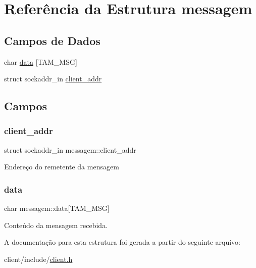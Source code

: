 \hypertarget{structmessagem}{}\section{Referência da Estrutura messagem}
\label{structmessagem}
\subsection*{Campos de Dados}
\begin{DoxyCompactItemize}
\item 
char \hyperlink{structmessagem_a23e2fc404fdd389c4ff6da925ab4ae21}{data} \mbox{[}T\+A\+M\+\_\+\+M\+SG\mbox{]}
\item 
struct sockaddr\+\_\+in \hyperlink{structmessagem_af4f1e53a419d163b87b5c4d510fb5a0f}{client\+\_\+addr}
\end{DoxyCompactItemize}


\subsection{Campos}
\mbox{\label{structmessagem_af4f1e53a419d163b87b5c4d510fb5a0f}} 
\subsubsection{\texorpdfstring{client\+\_\+addr}{client\_addr}}
{\footnotesize\ttfamily struct sockaddr\+\_\+in messagem\+::client\+\_\+addr}

Endereço do remetente da mensagem \mbox{\label{structmessagem_a23e2fc404fdd389c4ff6da925ab4ae21}} 
\subsubsection{\texorpdfstring{data}{data}}
{\footnotesize\ttfamily char messagem\+::data\mbox{[}T\+A\+M\+\_\+\+M\+SG\mbox{]}}

Conteúdo da mensagem recebida. 

A documentação para esta estrutura foi gerada a partir do seguinte arquivo\+:\begin{DoxyCompactItemize}
\item 
client/include/\hyperlink{client_8h}{client.\+h}\end{DoxyCompactItemize}
